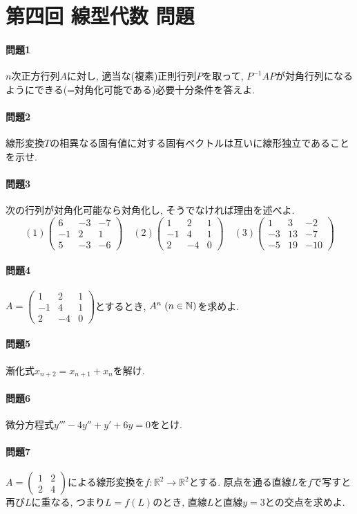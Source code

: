 \documentclass[a4j,dvipdfmx]{jsarticle}
\newcommand{\R}{\mathbb{R}}
\begin{document}
    \part*{第四回 線型代数 問題}
    \subsection*{問題1}
        $n$次正方行列$A$に対し, 適当な(複素)正則行列$P$を取って, $P^{-1}AP$が対角行列になるようにできる(=対角化可能である)必要十分条件を答えよ.
    \subsection*{問題2}
        線形変換$T$の相異なる固有値に対する固有ベクトルは互いに線形独立であることを示せ.
    \subsection*{問題3}
        次の行列が対角化可能なら対角化し, そうでなければ理由を述べよ.
        \begin{equation*}
            (1)\begin{pmatrix}
                6 & -3 & -7\\
                -1 & 2 & 1\\
                5 & -3 & -6
            \end{pmatrix}\quad 
            (2)\begin{pmatrix}
                1  & 2  & 1 \\
                -1 & 4  & 1 \\
                2  & -4 & 0 
            \end{pmatrix}\quad
            (3)\begin{pmatrix}
                1  & 3  & -2 \\
                -3 & 13  & -7 \\
                -5  & 19 & -10 
            \end{pmatrix}
        \end{equation*}
    \subsection*{問題4}
        $A=\begin{pmatrix}1 & 2 & 1\\-1 & 4 & 1\\2 & -4 & 0\end{pmatrix}$とするとき, $A^n\hspace{1mm}(n\in \mathbb{N})$を求めよ.
    \subsection*{問題5}
        漸化式$x_{n+2}=x_{n+1}+x_{n}$を解け.
    \subsection*{問題6}
        微分方程式$y'''-4y''+y'+6y=0$をとけ.
    \subsection*{問題7}
        $A=\begin{pmatrix}1 & 2\\2 & 4\end{pmatrix}$による線形変換を$f:\R^2\to\R^2$とする. 原点を通る直線$L$を$f$で写すと再び$L$に重なる, つまり$L=f(L)$のとき, 直線$L$と直線$y=3$との交点を求めよ.
\end{document}
